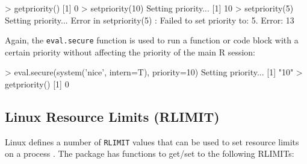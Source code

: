 \documentclass[article]{jss}
\newcommand{\R}{\textsf{R}\xspace}
\newcommand{\RAppArmor}{\pkg{RAppArmor}\xspace}
\begin{document}
\begin{CodeChunk}
\begin{CodeInput}
> getpriority()
[1] 0
> setpriority(10)
Setting priority...
[1] 10
> setpriority(5)
Setting priority...
Error in setpriority(5) : Failed to set priority to: 5.
Error: 13
\end{CodeInput}
\end{CodeChunk}

Again, the \texttt{eval.secure} function is used to run a function or code block
with a certain priority without affecting the priority of the main \R session:

\begin{CodeChunk}
\begin{CodeInput}
> eval.secure(system('nice', intern=T), priority=10)
Setting priority...
[1] "10"
> getpriority()
[1] 0
\end{CodeInput}
\end{CodeChunk}


\subsection{Linux Resource Limits (RLIMIT)}
\label{RLIMITS}

Linux defines a number of \texttt{RLIMIT} values that can be used to set
resource limits on a process \citep{linuxrlimit}. The \RAppArmor package
has functions to get/set to the following RLIMITs:
\end{document}
